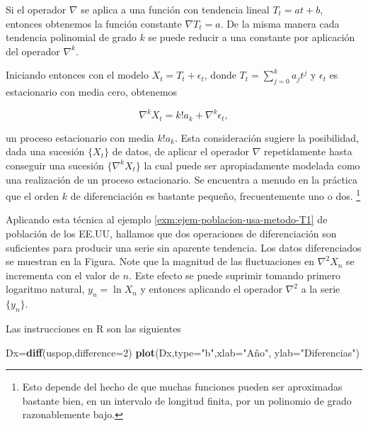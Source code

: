 \documentclass[12pt,]{krantz}
\makeatletter
\newenvironment{Shaded}{\begin{snugshade}}{\end{snugshade}}
\newcommand{\KeywordTok}[1]{\textcolor[rgb]{0.13,0.29,0.53}{\textbf{#1}}}
\newcommand{\DataTypeTok}[1]{\textcolor[rgb]{0.13,0.29,0.53}{#1}}
\newcommand{\DecValTok}[1]{\textcolor[rgb]{0.00,0.00,0.81}{#1}}
\newcommand{\StringTok}[1]{\textcolor[rgb]{0.31,0.60,0.02}{#1}}
\newcommand{\NormalTok}[1]{#1}
\newenvironment{kframe}{%
\medskip{}
\setlength{\fboxsep}{.8em}
 \def\at@end@of@kframe{}%
 \ifinner\ifhmode%
  \def\at@end@of@kframe{\end{minipage}}%
  \begin{minipage}{\columnwidth}%
 \fi\fi%
 \def\FrameCommand##1{\hskip\@totalleftmargin \hskip-\fboxsep
 \colorbox{shadecolor}{##1}\hskip-\fboxsep
     \hskip-\linewidth \hskip-\@totalleftmargin \hskip\columnwidth}%
 \MakeFramed {\advance\hsize-\width
   \@totalleftmargin\z@ \linewidth\hsize
   \@setminipage}}%
 {\par\unskip\endMakeFramed%
 \at@end@of@kframe}
\renewenvironment{Shaded}{\begin{kframe}}{\end{kframe}}
\theoremstyle{definition}
\theoremstyle{definition}
\theoremstyle{definition}
\theoremstyle{remark}
\let\BeginKnitrBlock\begin \let\EndKnitrBlock\end
\makeatother
\begin{document}
Si el operador \(\nabla\) se aplica a una función con tendencia lineal
\(T_t=at+b\), entonces obtenemos la función constante \(\nabla T_t=a\).
De la misma manera cada tendencia polinomial de grado \(k\) se puede
reducir a una constante por aplicación del operador \(\nabla^k\).

Iniciando entonces con el modelo \(X_t=T_t+\epsilon_t\), donde
\(T_t=\sum_{j=0}^ka_jt^j\) y \(\epsilon_t\) es estacionario con media
cero, obtenemos

\[\nabla^kX_t = k!a_k+\nabla^k\epsilon_t,\]

un proceso estacionario con media \(k!a_k\). Esta consideración sugiere
la posibilidad, dada una sucesión \(\{X_t\}\) de datos, de aplicar el
operador \(\nabla\) repetidamente hasta conseguir una sucesión
\(\{\nabla^kX_t\}\) la cual puede ser apropiadamente modelada como una
realización de un proceso estacionario. Se encuentra a menudo en la
práctica que el orden \(k\) de diferenciación es bastante pequeño,
frecuentemente uno o dos. \footnote{Esto depende del hecho de que muchas
  funciones pueden ser aproximadas bastante bien, en un intervalo de
  longitud finita, por un polinomio de grado razonablemente bajo.}

\BeginKnitrBlock{example}
\protect\hypertarget{exm:ejem-diferenciacion-poblacion-usa-T2}{}{\label{exm:ejem-diferenciacion-poblacion-usa-T2}
}Aplicando esta técnica al ejemplo
\ref{exm:ejem-poblacion-usa-metodo-T1} de población de los EE.UU,
hallamos que dos operaciones de diferenciación son suficientes para
producir una serie sin aparente tendencia. Los datos diferenciados se
muestran en la Figura. Note que la magnitud de las fluctuaciones en
\(\nabla^2X_n\) se incrementa con el valor de \(n\). Este efecto se
puede suprimir tomando primero logaritmo natural, \(y_n=\ln X_n\) y
entonces aplicando el operador \(\nabla^2\) a la serie \(\{y_n\}\).
\EndKnitrBlock{example}

Las instrucciones en R son las siguientes

\begin{Shaded}
\begin{Highlighting}[]
\NormalTok{Dx=}\KeywordTok{diff}\NormalTok{(uspop,}\DataTypeTok{difference=}\DecValTok{2}\NormalTok{)}
\KeywordTok{plot}\NormalTok{(Dx,}\DataTypeTok{type=}\StringTok{"b"}\NormalTok{,}\DataTypeTok{xlab=}\StringTok{"Año"}\NormalTok{, }\DataTypeTok{ylab=}\StringTok{"Diferencias"}\NormalTok{)}
\end{Highlighting}
\end{Shaded}
\end{document}
